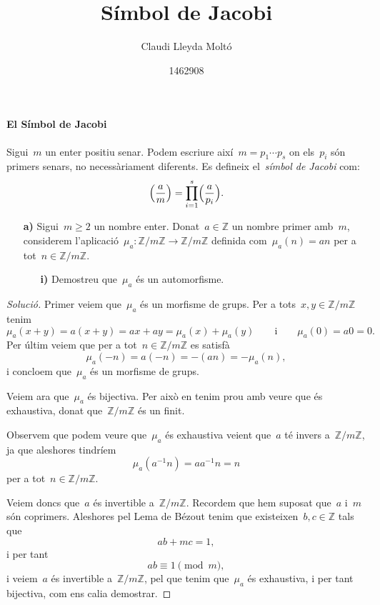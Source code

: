 \documentclass[a4paper]{article}
\title{Símbol de Jacobi}
\author{Claudi Lleyda Moltó}
\date{1462908}
\newcommand{\ZZ}{\mathbb{Z}}
\newenvironment{solution}{
    \renewcommand\qedsymbol{\ensuremath{\lozenge}}
    \begin{proof}[Solució]
        }{
    \end{proof}
}
\begin{document}
\maketitle

\paragraph{El Símbol de Jacobi} Sigui~\(m\) un enter positiu senar.
Podem escriure així~\(m=p_{1}\cdots p_{s}\) on els~\(p_{i}\) són primers senars,
no necessàriament diferents.
Es defineix el~\emph{símbol de Jacobi} com:
\[
    \Bigl(\frac{a}{m}\Bigr)
    =
    \prod_{i=1}^{s}
    \Bigl(\frac{a}{p_{i}}\Bigr).
\]

\begin{enumerate}
    \item[\textbf{a)}] Sigui~\(m\geq2\) un nombre enter.
        Donat~\(a\in\ZZ\) un nombre primer amb~\(m\),
        considerem l'aplicació~\(\mu_{a}:\ZZ/m\ZZ\longrightarrow\ZZ/m\ZZ\)
        definida com~\(\mu_{a}(n)=an\) per a tot~\(n\in\ZZ/m\ZZ\).
        \begin{enumerate}
            \item[\textbf{i)}] Demostreu que~\(\mu_{a}\) és un automorfisme.
        \end{enumerate}
\end{enumerate}

\begin{solution}
    Primer veiem que~\(\mu_{a}\) és un morfisme de grups.
    Per a tots~\(x,y\in\ZZ/m\ZZ\) tenim
    \[
        \mu_{a}(x+y) = a(x+y) = ax + ay = \mu_{a}(x) + \mu_{a}(y)
        \qquad
        \text{i}
        \qquad
        \mu_{a}(0) = a0 = 0.
    \]
    Per últim veiem que per a tot~\(n\in\ZZ/m\ZZ\) es satisfà
    \[
        \mu_{a}(-n) = a(-n) = -(an) = -\mu_{a}(n),
    \]
    i concloem que~\(\mu_{a}\) és un morfisme de grups.

    Veiem ara que~\(\mu_{a}\) és bijectiva.
    Per això en tenim prou amb veure que és exhaustiva,
    donat que~\(\ZZ/m\ZZ\) és un finit.

    Observem que podem veure que~\(\mu_{a}\) és exhaustiva veient que~\(a\) té
    invers a~\(\ZZ/m\ZZ\),
    ja que aleshores tindríem
    \[
        \mu_{a}(a^{-1}n) = aa^{-1}n = n
    \]
    per a tot~\(n\in\ZZ/m\ZZ\).

    Veiem doncs que~\(a\) és invertible a~\(\ZZ/m\ZZ\).
    Recordem que hem suposat que~\(a\) i~\(m\) són coprimers.
    Aleshores pel Lema de Bézout tenim que existeixen~\(b,c\in\ZZ\) tals que
    \[
        ab + mc = 1,
    \]
    i per tant
    \[
        ab \equiv 1 \pmod{m},
    \]
    i veiem~\(a\) és invertible a~\(\ZZ/m\ZZ\),
    pel que tenim que~\(\mu_{a}\) és exhaustiva,
    i per tant bijectiva,
    com ens calia demostrar.
\end{solution}
\end{document}
